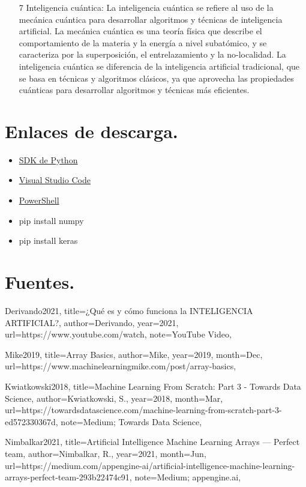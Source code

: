 \documentclass{article}
\theoremstyle{mytheoremstyle}
\theoremstyle{mytheoremstyle}
\theoremstyle{myproblemstyle}
\begin{document}
\begin{itemize}
    \item [7]Inteligencia cuántica: La inteligencia cuántica se refiere al uso de la mecánica cuántica para desarrollar algoritmos y técnicas de inteligencia artificial. La mecánica cuántica es una teoría física que describe el comportamiento de la materia y la energía a nivel subatómico, y se caracteriza por la superposición, el entrelazamiento y la no-localidad. La inteligencia cuántica se diferencia de la inteligencia artificial tradicional, que se basa en técnicas y algoritmos clásicos, ya que aprovecha las propiedades cuánticas para desarrollar algoritmos y técnicas más eficientes.
\end{itemize}
\section{Enlaces de descarga.}
\begin{itemize}
    \item \href{https://www.python.org/downloads/}{SDK de Python}
    \item \href{https://code.visualstudio.com/}{Visual Studio Code}
    \item \href{https://apps.microsoft.com/store/detail/powershell/}{PowerShell}
    \item pip install numpy
    \item pip install keras
\end{itemize}

\section{Fuentes.}
{Derivando2021,
  title={¿Qué es y cómo funciona la INTELIGENCIA ARTIFICIAL?},
  author={Derivando},
  year={2021},
  url={https://www.youtube.com/watch},
  note={YouTube Video},
}

{Mike2019,
  title={Array Basics},
  author={Mike},
  year={2019},
  month={Dec},
  url={https://www.machinelearningmike.com/post/array-basics},
}

{Kwiatkowski2018,
  title={Machine Learning From Scratch: Part 3 - Towards Data Science},
  author={Kwiatkowski, S.},
  year={2018},
  month={Mar},
  url={https://towardsdatascience.com/machine-learning-from-scratch-part-3-ed572330367d},
  note={Medium; Towards Data Science},
}

{Nimbalkar2021,
  title={Artificial Intelligence Machine Learning Arrays — Perfect team},
  author={Nimbalkar, R.},
  year={2021},
  month={Jun},
  url={https://medium.com/appengine-ai/artificial-intelligence-machine-learning-arrays-perfect-team-293b22474c91},
  note={Medium; appengine.ai},
}
\end{document}
